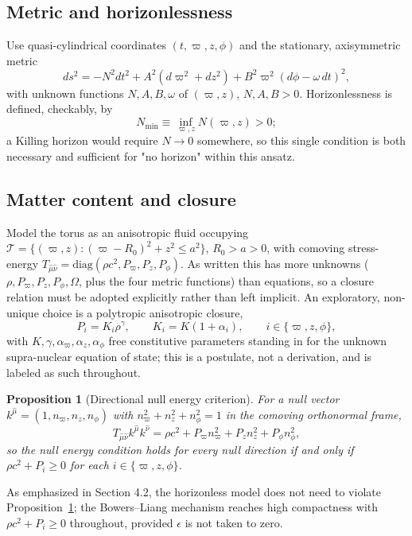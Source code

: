 \documentclass[11pt]{article}
\newtheorem{proposition}{Proposition}
\begin{document}
\subsection{Metric and horizonlessness}

Use quasi-cylindrical coordinates $(t,\varpi,z,\phi)$ and the stationary, axisymmetric metric
\begin{equation}
ds^2 = -N^2 dt^2 + A^2\left(d\varpi^2+dz^2\right) + B^2\varpi^2\left(d\phi-\omega\,dt\right)^2,
\end{equation}
with unknown functions $N,A,B,\omega$ of $(\varpi,z)$, $N,A,B>0$. Horizonlessness is defined, checkably, by
\begin{equation}
N_{\min} \equiv \inf_{\varpi,z} N(\varpi,z) > 0;
\end{equation}
a Killing horizon would require $N\to0$ somewhere, so this single condition is both necessary and sufficient for "no horizon" within this ansatz.

\subsection{Matter content and closure}

Model the torus as an anisotropic fluid occupying $\mathcal{T} = \{(\varpi,z): (\varpi-R_0)^2+z^2\leq a^2\}$, $R_0>a>0$, with comoving stress-energy $T_{\hat\mu\hat\nu} = \mathrm{diag}(\rho c^2, P_\varpi, P_z, P_\phi)$. As written this has more unknowns ($\rho,P_\varpi,P_z,P_\phi,\Omega$, plus the four metric functions) than equations, so a closure relation must be adopted explicitly rather than left implicit. An exploratory, non-unique choice is a polytropic anisotropic closure,
\begin{equation}
P_i = K_i \rho^\gamma, \qquad K_i = K(1+\alpha_i), \qquad i\in\{\varpi,z,\phi\},
\end{equation}
with $K,\gamma,\alpha_\varpi,\alpha_z,\alpha_\phi$ free constitutive parameters standing in for the unknown supra-nuclear equation of state; this is a postulate, not a derivation, and is labeled as such throughout.

\begin{proposition}[Directional null energy criterion]
\label{prop:nec}
For a null vector $k^{\hat\mu}=(1,n_\varpi,n_z,n_\phi)$ with $n_\varpi^2+n_z^2+n_\phi^2=1$ in the comoving orthonormal frame,
\begin{equation}
T_{\hat\mu\hat\nu}k^{\hat\mu}k^{\hat\nu} = \rho c^2 + P_\varpi n_\varpi^2 + P_z n_z^2 + P_\phi n_\phi^2,
\end{equation}
so the null energy condition holds for every null direction if and only if $\rho c^2 + P_i \geq 0$ for each $i\in\{\varpi,z,\phi\}$.
\end{proposition}
As emphasized in Section 4.2, the horizonless model does not need to violate Proposition~\ref{prop:nec}; the Bowers--Liang mechanism reaches high compactness with $\rho c^2+P_i\geq0$ throughout, provided $\epsilon$ is not taken to zero.
\end{document}
